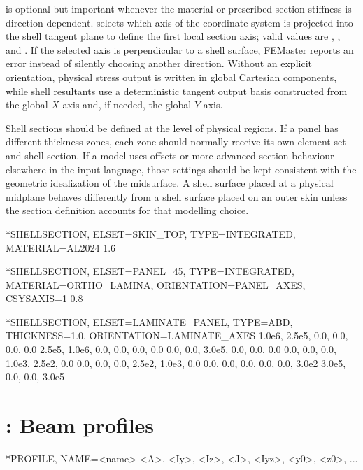 is optional but important whenever the material or prescribed section stiffness is direction-dependent.  selects which axis of the coordinate system is projected into the shell tangent plane to define the first local section axis; valid values are , , and . If the selected axis is perpendicular to a shell surface, FEMaster reports an error instead of silently choosing another direction. Without an explicit orientation, physical stress output is written in global Cartesian components, while shell resultants use a deterministic tangent output basis constructed from the global \(X\) axis and, if needed, the global \(Y\) axis.

Shell sections should be defined at the level of physical regions. If a panel has different thickness zones, each zone should normally receive its own element set and shell section. If a model uses offsets or more advanced section behaviour elsewhere in the input language, those settings should be kept consistent with the geometric idealization of the midsurface. A shell surface placed at a physical midplane behaves differently from a shell surface placed on an outer skin unless the section definition accounts for that modelling choice.

\begin{exampledeck}
*SHELLSECTION, ELSET=SKIN_TOP, TYPE=INTEGRATED, MATERIAL=AL2024
1.6
\end{exampledeck}

\begin{exampledeck}
*SHELLSECTION, ELSET=PANEL_45, TYPE=INTEGRATED, MATERIAL=ORTHO_LAMINA, ORIENTATION=PANEL_AXES, CSYSAXIS=1
0.8
\end{exampledeck}

\begin{exampledeck}
*SHELLSECTION, ELSET=LAMINATE_PANEL, TYPE=ABD, THICKNESS=1.0, ORIENTATION=LAMINATE_AXES
1.0e6, 2.5e5, 0.0, 0.0, 0.0, 0.0
2.5e5, 1.0e6, 0.0, 0.0, 0.0, 0.0
0.0, 0.0, 3.0e5, 0.0, 0.0, 0.0
0.0, 0.0, 0.0, 1.0e3, 2.5e2, 0.0
0.0, 0.0, 0.0, 2.5e2, 1.0e3, 0.0
0.0, 0.0, 0.0, 0.0, 0.0, 3.0e2
3.0e5, 0.0, 0.0, 3.0e5
\end{exampledeck}

\clearpage

\section{: Beam profiles}

\begin{syntax}
*PROFILE, NAME=<name>
<A>, <Iy>, <Iz>, <J>, <Iyz>, <y0>, <z0>, ...
\end{syntax}

